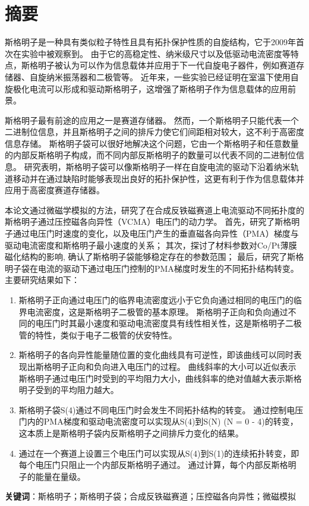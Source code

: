 \chapter*{摘要}
斯格明子是一种具有类似粒子特性且具有拓扑保护性质的自旋结构，它于2009年首次在实验中被观察到。
由于它的高稳定性、纳米级尺寸以及低驱动电流密度等特点，斯格明子被认为可以作为信息载体并应用于下一代自旋电子器件，例如赛道存储器、自旋纳米振荡器和二极管等。
近年来，一些实验已经证明在室温下使用自旋极化电流可以形成和驱动斯格明子，这增强了斯格明子作为信息载体的应用前景。\par
斯格明子最有前途的应用之一是赛道存储器。
然而，一个斯格明子只能代表一个二进制位信息，并且斯格明子之间的排斥力使它们间距相对较大，这不利于高密度信息存储。
斯格明子袋可以很好地解决这个问题，它由一个斯格明子和任意数量的内部反斯格明子构成，而不同内部反斯格明子的数量可以代表不同的二进制位信息。
研究表明，斯格明子袋可以像斯格明子一样在自旋电流的驱动下沿着纳米轨道移动并在通过缺陷时能够表现出良好的拓扑保护性，这更有利于作为信息载体并应用于高密度赛道存储器。\par
本论文通过微磁学模拟的方法，研究了在合成反铁磁赛道上电流驱动不同拓扑度的斯格明子通过压控磁各向异性（VCMA）电压门的动力学。
首先，研究了斯格明子通过电压门时速度的变化，以及电压门产生的垂直磁各向异性（PMA）梯度与驱动电流密度和斯格明子最小速度的关系；
其次，探讨了材料参数对Co/Pt薄膜磁化结构的影响, 确认了斯格明子袋能够稳定存在的参数范围；
最后，研究了斯格明子袋在电流的驱动下通过电压门控制的PMA梯度时发生的不同拓扑结构转变。
主要研究结果如下：
\begin{enumerate}[label=(\arabic*), leftmargin=4ex, labelsep=1.4ex, itemsep=0pt, topsep=1ex,partopsep=1ex,parsep=0pt]
    \item 斯格明子正向通过电压门的临界电流密度远小于它负向通过相同的电压门的临界电流密度，这是斯格明子二极管的基本原理。
    斯格明子正向和负向通过不同的电压门时其最小速度和驱动电流密度具有线性相关性，这是斯格明子二极管的特性，类似于电子二极管的伏安特性。
    \item 斯格明子的各向异性能量随位置的变化曲线具有可逆性，即该曲线可以同时表现出斯格明子正向和负向进入电压门的过程。
    曲线斜率的大小可以近似表示斯格明子通过电压门时受到的平均阻力大小，曲线斜率的绝对值越大表示斯格明子受到的平均阻力越大。
    \item 斯格明子袋S(4)通过不同电压门时会发生不同拓扑结构的转变。
    通过控制电压门内的PMA梯度和驱动电流密度可以实现从S(4)到S(N) (N = 0 - 4)的转变，这本质上是斯格明子袋内反斯格明子之间排斥力变化的结果。
    \item 通过在一个赛道上设置三个电压门可以实现从S(4)到S(1)的连续拓扑转变，即每个电压门只阻止一个内部反斯格明子通过。
    通过计算，每个内部反斯格明子的能量在量级。
\end{enumerate}
\vspace{1em}
\textbf{关键词}：斯格明子；斯格明子袋；合成反铁磁赛道；压控磁各向异性；微磁模拟
\newpage
\thispagestyle{empty}
